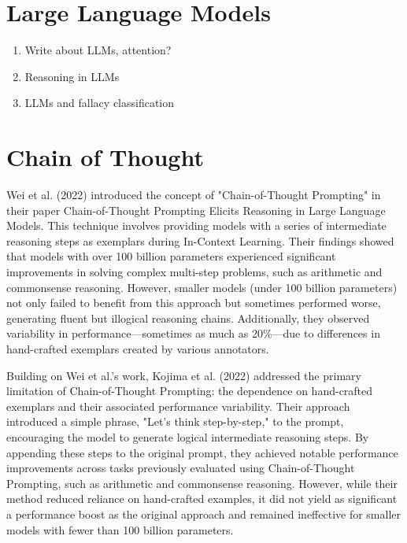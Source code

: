 \section{Large Language Models}

\begin{enumerate}
    \item Write about LLMs, attention?
    \item Reasoning in LLMs
    \item LLMs and fallacy classification
\end{enumerate}


\section{Chain of Thought}

Wei et al. (2022) \cite{ChainThoughtPromptingElicits} introduced the concept of "Chain-of-Thought Prompting" in their paper Chain-of-Thought Prompting Elicits Reasoning in Large Language Models. This technique involves providing models with a series of intermediate reasoning steps as exemplars during In-Context Learning. Their findings showed that models with over 100 billion parameters experienced significant improvements in solving complex multi-step problems, such as arithmetic and commonsense reasoning. However, smaller models (under 100 billion parameters) not only failed to benefit from this approach but sometimes performed worse, generating fluent but illogical reasoning chains. Additionally, they observed variability in performance—sometimes as much as 20\%—due to differences in hand-crafted exemplars created by various annotators.

Building on Wei et al.'s work, Kojima et al. (2022) \cite{kojimaLargeLanguageModels2023} addressed the primary limitation of Chain-of-Thought Prompting: the dependence on hand-crafted exemplars and their associated performance variability. Their approach introduced a simple phrase, "Let’s think step-by-step," to the prompt, encouraging the model to generate logical intermediate reasoning steps. By appending these steps to the original prompt, they achieved notable performance improvements across tasks previously evaluated using Chain-of-Thought Prompting, such as arithmetic and commonsense reasoning. However, while their method reduced reliance on hand-crafted examples, it did not yield as significant a performance boost as the original approach and remained ineffective for smaller models with fewer than 100 billion parameters.